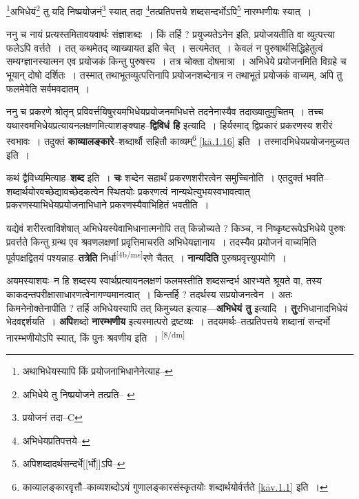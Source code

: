 \documentclass[article,12pt,a4paper]{memoir}
\begin{document}
	  \pstart \footnote{अथाभिधेयस्यापि किं प्रयोजनाभिधानेनेत्याह--\cite{dp-msD-n}}अभिधेयं\footnote{अभिधेये तु निष्प्रयोजने तत्प्रति--\cite{dp-msB} \cite{dp-msD}} तु यदि निष्प्रयोजनं\footnote{प्रयोजनं तदा--C} स्यात् तदा \footnote{अभिधेयप्रतिपत्तये--\cite{dp-msD-n}}तत्प्रतिपत्तये शब्दसन्दर्भोऽपि\footnote{अपिशब्दादर्थसन्दर्भे[[र्भो]]ऽपि--\cite{dp-msD-n}} नारम्भणीयः स्यात् ।
	\pend
      

	  \pstart ननु च नायं प्रत्यस्तमितावयवार्थः संज्ञाशब्दः । किं तर्हि ? प्रयुज्यतेऽनेन इति, प्रयोजयतीति वा व्युत्पत्त्या फलेऽपि वर्त्तते । तत् कथमेतद् व्याख्यायत इति चेत् । सत्यमेतत् । केवलं न पुरुषार्थसिद्धिहेतुत्वं सम्यग्ज्ञानस्यात्मन एव प्रयोजकं किन्तु पुरुषस्य । तत्र चोक्ता दोषमात्रा । अभिधेये प्रयोजनमिति विग्रहे च भूयान् दोषो दर्शितः । तस्मात् तथाभूतव्युत्पत्तिनापि प्रयोजनशब्देनात्र न तथाभूतं प्रयोजकं वाच्यम्, अपि तु फलमेवेति सर्वमवदातम् ।
	\pend
      

	  \pstart ननु च प्रकरणे श्रोतृन् प्रविवर्त्तयिषुरयमभिधेयप्रयोजनमभिधत्ते तदनेनास्यैव तदाख्यातुमुचितम् । तच्च यथास्वमभिधेयप्रत्यायनलक्षणमित्याशङ्क्याह--\textbf{द्विविधं हि} इत्यादि । हिर्यस्माद् द्विप्रकारं प्रकरणस्य शरीरं स्वभावः । तदुक्तं \textbf{काव्यालङ्कारे}--शब्दार्थौ सहितौ काव्यम्\footnote{काव्यालङ्कारवृत्तौ--काव्यशब्दोऽयं गुणालङ्कारसंस्कृतयोः शब्दार्थयोर्वर्त्तते \cref{kāv.1.1} इति ।} \cref{kā.1.16} इति । तस्मादभिधेयप्रयोजनमुच्यत इति ।
	\pend
      

	  \pstart कथं द्वैविध्यमित्याह--\textbf{शब्द} इति । \textbf{चः} शब्देन सहार्थं प्रकरणशरीरत्वेन समुच्चिनोति । एतदुक्तं भवति--शब्दार्थयोरवच्छेद्यावच्छेदकत्वेन स्थितयोः प्रकरणत्वं नान्यथेत्युभयस्वभावत्वात् प्रकरणस्याभिधेयप्रयोजनाभिधाने प्रकरणस्यैवाभिहितं भवतीति ।
	\pend
      

	  \pstart यद्येवं शरीरत्वाविशेषात् अभिधेयस्येवाभिधानात्मनोपि तत् किन्नोच्यते ? किञ्च, न निष्कृष्टरूपेऽभिधेये पुरुषः प्रवर्त्तते किन्तु ग्रन्थ एव श्रवणलक्षणां प्रवृत्तिमाचरति अभिधेयज्ञानाय । तदस्यैव प्रयोजनं वाच्यमिति पूर्वपक्षद्वितयं पश्यन्नाह--\textbf{तत्रेति} निर्धा\leavevmode\textsuperscript{\rmlatinfont\tiny [4b/ms]}रणे चैतत् । \textbf{नान्यदिति} पुरुषप्रवृत्त्युपयोगि ।
	\pend
      

	  \pstart अयमस्याशयः--न हि शब्दस्य स्वार्थप्रत्यायनलक्षणं फलमस्तीति शब्दसन्दर्भ आरभ्यते श्रूयते वा, तस्य काकदन्तपरीक्षासाधारणत्वेनागण्यमानत्वात् । किन्तर्हि ? तदर्थस्य सप्रयोजनत्वेन । अतः किमनेनोक्तेनापीति ? तर्हि अभिधेयस्यापि तत् किमुच्यत इत्याह—\textbf{अभिधेयं तु} इत्यादि । \textbf{तु}रभिधानादभिधेयं भेदवद्दर्शयति । \textbf{अपि}शब्दो \textbf{नारम्भणीय} इत्यस्मात्परो द्रष्टव्यः । तदयमर्थः--तत्प्रतिपत्तये शब्दानां सन्दर्भो नारम्भणीयोऽपि स्यात्, किं पुनः श्रवणीय इति ।
	\pend
      \leavevmode\textsuperscript{\rmlatinfont\tiny [8/dm]}
\end{document}
